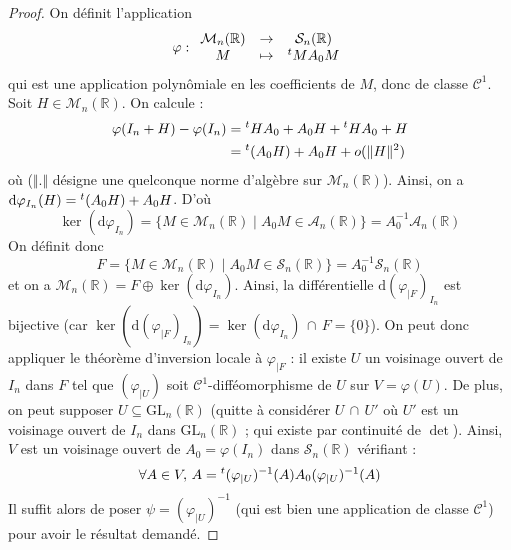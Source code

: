   \begin{proof}
    On définit l'application
    \[ \varphi :
    \begin{array}{ccc}
      \mathcal{M}_n(\mathbb{R}) &\rightarrow& \mathcal{S}_n(\mathbb{R}) \\
      M &\mapsto& \mathstrut ^t M A_0 M
    \end{array}
    \]
    qui est une application polynômiale en les coefficients de $M$, donc de classe $\mathcal{C}^1$. Soit $H \in \mathcal{M}_n(\mathbb{R})$. On calcule :
    \begin{align*}
      \varphi(I_n + H) - \varphi(I_n) &= \mathstrut ^t H A_0 + A_0 H + \mathstrut ^t H A_0 + H \\
      &= \mathstrut ^t (A_0 H) + A_0 H + o(\Vert H \Vert^2)
    \end{align*}
    où ($\Vert . \Vert$ désigne une quelconque norme d'algèbre sur $\mathcal{M}_n(\mathbb{R})$). Ainsi, on a $\mathrm{d} \varphi_{I_n}(H) = \mathstrut ^t (A_0 H) + A_0 H$. D'où
    \[ \ker(\mathrm{d} \varphi_{I_n}) = \{ M \in \mathcal{M}_n(\mathbb{R}) \mid A_0 M \in \mathcal{A}_n(\mathbb{R}) \} = A_0^{-1} \mathcal{A}_n(\mathbb{R}) \]
    On définit donc
    \[ F = \{ M \in \mathcal{M}_n(\mathbb{R}) \mid A_0 M \in \mathcal{S}_n(\mathbb{R}) \} = A_0^{-1} \mathcal{S}_n(\mathbb{R})  \]
    et on a $\mathcal{M}_n(\mathbb{R}) = F \oplus \ker(\mathrm{d} \varphi_{I_n})$. Ainsi, la différentielle $\mathrm{d} (\varphi_{|F})_{I_n}$ est bijective (car $\ker(\mathrm{d} (\varphi_{|F})_{I_n}) = \ker(\mathrm{d} \varphi_{I_n}) \, \cap \, F = \{ 0 \}$).
    \newpar
    On peut donc appliquer le théorème d'inversion locale à $\varphi_{|F}$ : il existe $U$ un voisinage ouvert de $I_n$ dans $F$ tel que $(\varphi_{|U})$ soit $\mathcal{C}^1$-difféomorphisme de $U$ sur $V = \varphi(U)$. De plus, on peut supposer $U \subseteq \mathrm{GL}_n(\mathbb{R})$ (quitte à considérer $U \, \cap \, U'$ où $U'$ est un voisinage ouvert de $I_n$ dans $\mathrm{GL}_n(\mathbb{R})$ ; qui existe par continuité de $\det$).
    \newpar
    Ainsi, $V$ est un voisinage ouvert de $A_0 = \varphi(I_n)$ dans $\mathcal{S}_n(\mathbb{R})$ vérifiant :
    \[ \forall A \in V, \, A = \mathstrut ^t (\varphi_{|U})^{-1}(A) A_0 (\varphi_{|U})^{-1}(A) \]
    Il suffit alors de poser $\psi = (\varphi_{|U})^{-1}$ (qui est bien une application de classe $\mathcal{C}^1$) pour avoir le résultat demandé.
  \end{proof}


